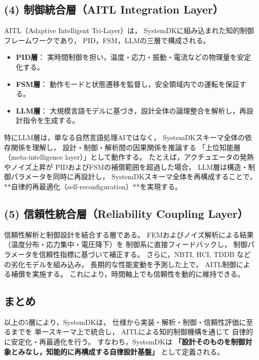 \subsection{(4) 制御統合層（AITL Integration Layer）}
AITL（Adaptive Intelligent Tri-Layer）は，
SystemDKに組み込まれた知的制御フレームワークであり，
PID，FSM，LLMの三層で構成される。

\begin{itemize}
  \item \textbf{PID層}： 実時間制御を担い，温度・応力・振動・電流などの物理量を安定化する。
  \item \textbf{FSM層}： 動作モードと状態遷移を監督し，安全領域内での運転を保証する。
  \item \textbf{LLM層}： 大規模言語モデルに基づき，設計全体の論理整合を解析し，再設計指令を生成する。
\end{itemize}

特にLLM層は，単なる自然言語処理AIではなく，
SystemDKスキーマ全体の依存関係を理解し，
設計・制御・解析間の因果関係を推論する
「上位知能層（meta-intelligence layer）」として動作する。
たとえば，アクチュエータの発熱やノイズ上昇が
PIDおよびFSMの補償範囲を超過した場合，
LLM層は構造・制御パラメータを同時に再設計し，
SystemDKスキーマ全体を再構成することで，
**自律的再最適化（self-reconfiguration）**を実現する。

\subsection{(5) 信頼性統合層（Reliability Coupling Layer）}
信頼性解析と制御設計を結合する層である。
FEMおよびノイズ解析による結果（温度分布・応力集中・電圧降下）を
制御系に直接フィードバックし，
制御パラメータを信頼性指標に基づいて補正する。
さらに，NBTI, HCI, TDDB などの劣化モデルを組み込み，
長期的な性能変動を予測した上で，
AITL制御による補償を実施する。
これにより，時間軸上でも信頼性を動的に維持できる。

\subsection*{まとめ}
以上の5層により，SystemDKは，
仕様から実装・解析・制御・信頼性評価に至るまでを
単一スキーマ上で統合し，
AITLによる知的制御機構を通じて
自律的に安定化・再最適化を行う。
すなわち，SystemDKは
\textbf{「設計そのものを制御対象とみなし，知能的に再構成する自律設計基盤」}
として定義される。

